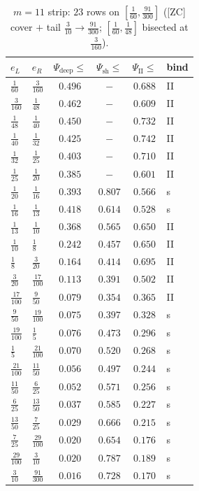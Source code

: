 \begin{table}[p]\centering\small
\caption{$m=11$ strip: $23$ rows on $[\tfrac1{60},\tfrac{91}{300}]$ ([ZC] cover $+$ tail $\tfrac3{10}\!\to\!\tfrac{91}{300}$; $[\tfrac1{60},\tfrac1{48}]$ bisected at $\tfrac3{160}$).}\label{zc9:tab:m11}
\begin{tabular}{llcccl}\toprule
$e_L$&$e_R$&$\Psi_{\mathrm{deep}}\!\le$&$\Psi_{\mathrm{sh}}\!\le$&$\Psi_{\mathrm{II}}\!\le$&bind\\\midrule
$\tfrac{1}{60}$&$\tfrac{3}{160}$&$0.496$&$-$&$0.688$&II\\
$\tfrac{3}{160}$&$\tfrac{1}{48}$&$0.462$&$-$&$0.609$&II\\
$\tfrac{1}{48}$&$\tfrac{1}{40}$&$0.450$&$-$&$0.732$&II\\
$\tfrac{1}{40}$&$\tfrac{1}{32}$&$0.425$&$-$&$0.742$&II\\
$\tfrac{1}{32}$&$\tfrac{1}{25}$&$0.403$&$-$&$0.710$&II\\
$\tfrac{1}{25}$&$\tfrac{1}{20}$&$0.385$&$-$&$0.601$&II\\
$\tfrac{1}{20}$&$\tfrac{1}{16}$&$0.393$&$0.807$&$0.566$&s\\
$\tfrac{1}{16}$&$\tfrac{1}{13}$&$0.418$&$0.614$&$0.528$&s\\
$\tfrac{1}{13}$&$\tfrac{1}{10}$&$0.368$&$0.565$&$0.650$&II\\
$\tfrac{1}{10}$&$\tfrac{1}{8}$&$0.242$&$0.457$&$0.650$&II\\
$\tfrac{1}{8}$&$\tfrac{3}{20}$&$0.164$&$0.414$&$0.695$&II\\
$\tfrac{3}{20}$&$\tfrac{17}{100}$&$0.113$&$0.391$&$0.502$&II\\
$\tfrac{17}{100}$&$\tfrac{9}{50}$&$0.079$&$0.354$&$0.365$&II\\
$\tfrac{9}{50}$&$\tfrac{19}{100}$&$0.075$&$0.397$&$0.328$&s\\
$\tfrac{19}{100}$&$\tfrac{1}{5}$&$0.076$&$0.473$&$0.296$&s\\
$\tfrac{1}{5}$&$\tfrac{21}{100}$&$0.070$&$0.520$&$0.268$&s\\
$\tfrac{21}{100}$&$\tfrac{11}{50}$&$0.056$&$0.497$&$0.244$&s\\
$\tfrac{11}{50}$&$\tfrac{6}{25}$&$0.052$&$0.571$&$0.256$&s\\
$\tfrac{6}{25}$&$\tfrac{13}{50}$&$0.037$&$0.585$&$0.227$&s\\
$\tfrac{13}{50}$&$\tfrac{7}{25}$&$0.029$&$0.666$&$0.215$&s\\
$\tfrac{7}{25}$&$\tfrac{29}{100}$&$0.020$&$0.654$&$0.176$&s\\
$\tfrac{29}{100}$&$\tfrac{3}{10}$&$0.020$&$0.787$&$0.189$&s\\
$\tfrac{3}{10}$&$\tfrac{91}{300}$&$0.016$&$0.728$&$0.170$&s\\
\bottomrule\end{tabular}\end{table}
